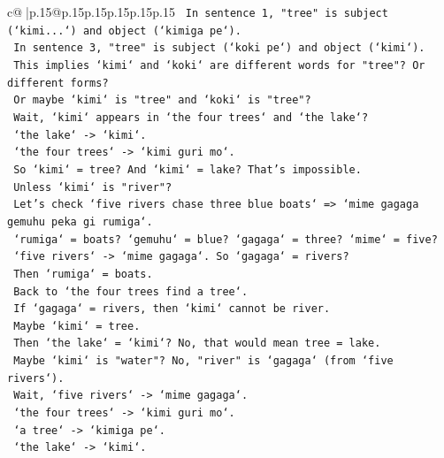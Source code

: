 \documentclass{article}
\begin{document}
{\begin{supertabular}{c@{$\;$}|p{.15\linewidth}@{}p{.15\linewidth}p{.15\linewidth}p{.15\linewidth}p{.15\linewidth}p{.15\linewidth}}
{{{\texttt{                    In sentence 1, "tree" is subject (`kimi...`) and object (`kimiga pe`).} \\
\texttt{                    In sentence 3, "tree" is subject (`koki pe`) and object (`kimi`).} \\
\texttt{                    This implies `kimi` and `koki` are different words for "tree"? Or different forms?} \\
\texttt{                    Or maybe `kimi` is "tree" and `koki` is "tree"?} \\
\texttt{                    Wait, `kimi` appears in `the four trees` and `the lake`?} \\
\texttt{                    `the lake` {-}> `kimi`.} \\
\texttt{                    `the four trees` {-}> `kimi guri mo`.} \\
\texttt{                    So `kimi` = tree? And `kimi` = lake? That's impossible.} \\
\texttt{                    Unless `kimi` is "river"?} \\
\texttt{                    Let's check `five rivers chase three blue boats` => `mime gagaga gemuhu peka gi rumiga`.} \\
\texttt{                    `rumiga` = boats? `gemuhu` = blue? `gagaga` = three? `mime` = five?} \\
\texttt{                    `five rivers` {-}> `mime gagaga`. So `gagaga` = rivers?} \\
\texttt{                    Then `rumiga` = boats.} \\
\texttt{                    Back to `the four trees find a tree`.} \\
\texttt{                    If `gagaga` = rivers, then `kimi` cannot be river.} \\
\texttt{                    Maybe `kimi` = tree.} \\
\texttt{                    Then `the lake` = `kimi`? No, that would mean tree = lake.} \\
\texttt{                    Maybe `kimi` is "water"? No, "river" is `gagaga` (from `five rivers`).} \\
\texttt{                    Wait, `five rivers` {-}> `mime gagaga`.} \\
\texttt{                    `the four trees` {-}> `kimi guri mo`.} \\
\texttt{                    `a tree` {-}> `kimiga pe`.} \\
\texttt{                    `the lake` {-}> `kimi`.} \\
}}}
\end{supertabular}}
\end{document}
